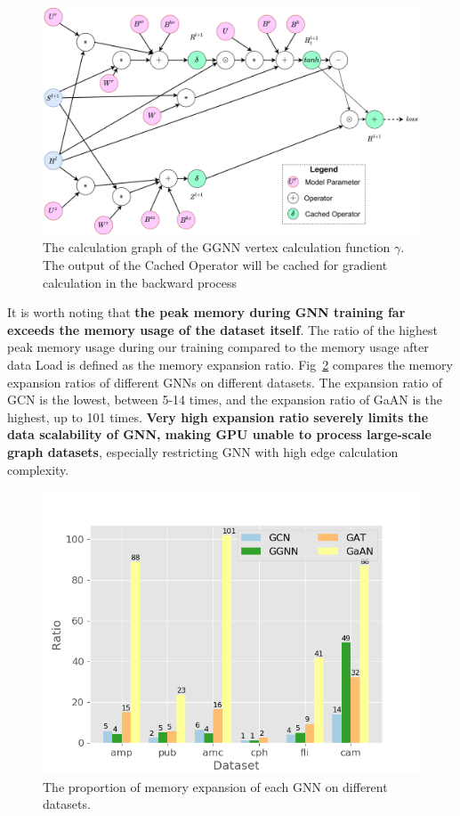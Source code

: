 \begin{figure}
    \centering
    \includegraphics[width=0.7\columnwidth]{figs/illustration/ggnn_vertex_func_computation_graph.png}
    \caption{The calculation graph of the GGNN vertex calculation function $\gamma$. The output of the Cached Operator will be cached for gradient calculation in the backward process}
    \label{fig:ggnn_vertex_func_computation_graph}
\end{figure}

It is worth noting that \textbf{the peak memory during GNN training far exceeds the memory usage of the dataset itself}.
The ratio of the highest peak memory usage during our training compared to the memory usage after data Load is
defined as the memory expansion ratio. Fig~\ref{fig:exp_memory_expansion_ratio} compares the memory expansion ratios
of different GNNs on different datasets. The expansion ratio of GCN is the lowest, between 5-14 times,
and the expansion ratio of GaAN is the highest, up to 101 times.
\textbf{Very high expansion ratio severely limits the data scalability of GNN, making GPU unable to process large-scale graph datasets},
especially restricting GNN with high edge calculation complexity.

\begin{figure}
    \centering
    \includegraphics[width=0.7\columnwidth]{figs/experiments/exp_memory_expansion_ratio.png}
    \caption{The proportion of memory expansion of each GNN on different datasets.}
    \label{fig:exp_memory_expansion_ratio}
\end{figure}

